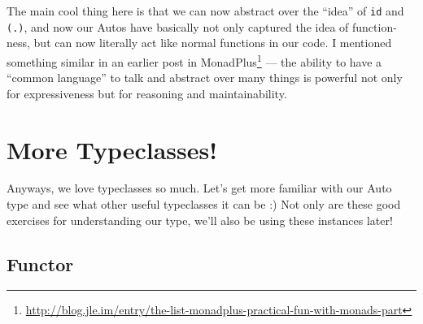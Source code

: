 \documentclass[]{article}
\newenvironment{Shaded}{}{}
\newcommand{\DecValTok}[1]{\textcolor[rgb]{0.25,0.63,0.44}{#1}}
\newcommand{\FunctionTok}[1]{\textcolor[rgb]{0.02,0.16,0.49}{#1}}
\newcommand{\NormalTok}[1]{#1}
\newcommand{\OperatorTok}[1]{\textcolor[rgb]{0.40,0.40,0.40}{#1}}
\renewcommand{\href}[2]{#2\footnote{\url{#1}}}
\begin{document}
\begin{Shaded}
\end{Shaded}

The main cool thing here is that we can now abstract over the ``idea'' of
\texttt{id} and \texttt{(.)}, and now our Autos have basically not only captured
the idea of function-ness, but can now literally act like normal functions in
our code. I mentioned something similar in an earlier post
\href{http://blog.jle.im/entry/the-list-monadplus-practical-fun-with-monads-part}{in
MonadPlus} --- the ability to have a ``common language'' to talk and abstract
over many things is powerful not only for expressiveness but for reasoning and
maintainability.

\hypertarget{more-typeclasses}{%
\section{More Typeclasses!}\label{more-typeclasses}}

Anyways, we love typeclasses so much. Let's get more familiar with our Auto type
and see what other useful typeclasses it can be :) Not only are these good
exercises for understanding our type, we'll also be using these instances later!

\hypertarget{functor}{%
\subsection{Functor}\label{functor}}
\end{document}
